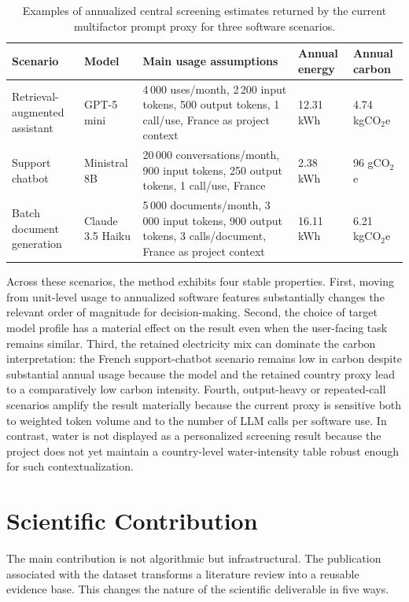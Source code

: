 \documentclass[11pt,a4paper]{article}
\begin{document}
\begin{table}[htbp]
\centering
\small
\begin{tabularx}{\textwidth}{|L{3.1cm}|L{2.1cm}|Y|L{1.9cm}|L{1.9cm}|}
\hline
Scenario & Model & Main usage assumptions & Annual energy & Annual carbon \\
\hline
Retrieval-augmented assistant & GPT-5 mini & 4\,000 uses/month, 2\,200 input tokens, 500 output tokens, 1 call/use, France as project context & 12.31 kWh & 4.74 kgCO$_2$e \\
\hline
Support chatbot & Ministral 8B & 20\,000 conversations/month, 900 input tokens, 250 output tokens, 1 call/use, France & 2.38 kWh & 96 gCO$_2$e \\
\hline
Batch document generation & Claude 3.5 Haiku & 5\,000 documents/month, 3\,000 input tokens, 900 output tokens, 3 calls/document, France as project context & 16.11 kWh & 6.21 kgCO$_2$e \\
\hline
\end{tabularx}
\caption{Examples of annualized central screening estimates returned by the current multifactor prompt proxy for three software scenarios.}
\label{tab:scenario-examples}
\end{table}

Across these scenarios, the method exhibits four stable properties. First, moving from unit-level usage to annualized software features substantially changes the relevant order of magnitude for decision-making. Second, the choice of target model profile has a material effect on the result even when the user-facing task remains similar. Third, the retained electricity mix can dominate the carbon interpretation: the French support-chatbot scenario remains low in carbon despite substantial annual usage because the model and the retained country proxy lead to a comparatively low carbon intensity. Fourth, output-heavy or repeated-call scenarios amplify the result materially because the current proxy is sensitive both to weighted token volume and to the number of LLM calls per software use. In contrast, water is not displayed as a personalized screening result because the project does not yet maintain a country-level water-intensity table robust enough for such contextualization.

\section{Scientific Contribution}
The main contribution is not algorithmic but infrastructural. The publication associated with the dataset transforms a literature review into a reusable evidence base. This changes the nature of the scientific deliverable in five ways.
\end{document}
